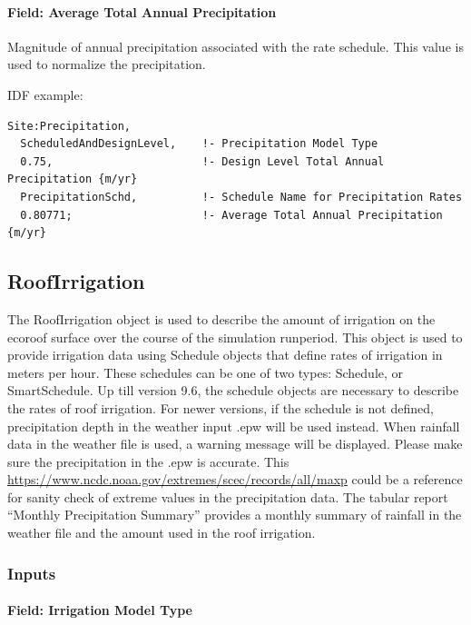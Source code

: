 \paragraph{Field: Average Total Annual Precipitation}\label{field-average-total-annual-precipitation}

Magnitude of annual precipitation associated with the rate schedule. This value is used to normalize the precipitation.

IDF example:

\begin{lstlisting}
Site:Precipitation,
  ScheduledAndDesignLevel,    !- Precipitation Model Type
  0.75,                       !- Design Level Total Annual Precipitation {m/yr}
  PrecipitationSchd,          !- Schedule Name for Precipitation Rates
  0.80771;                    !- Average Total Annual Precipitation {m/yr}
\end{lstlisting}

\subsection{RoofIrrigation}\label{roofirrigation}

The RoofIrrigation object is used to describe the amount of irrigation on the
ecoroof surface over the course of the simulation runperiod. This object is used
to provide irrigation data using Schedule objects that define rates of
irrigation in meters per hour. These schedules can be one of two types:
Schedule, or SmartSchedule. Up till version 9.6, the schedule objects are
necessary to describe the rates of roof irrigation. For newer versions, if the
schedule is not defined, precipitation depth in the weather input .epw will be
used instead. When rainfall data in the weather file is used, a
warning message will be displayed. Please make sure the precipitation in the
.epw is accurate. This \href{table by the State Climate Extreme
Committee}{https://www.ncdc.noaa.gov/extremes/scec/records/all/maxp} could be a
reference for sanity check of extreme values in the precipitation data. The
tabular report ``Monthly Precipitation Summary'' provides a monthly summary of
rainfall in the weather file and the amount used in the roof irrigation.

\subsubsection{Inputs}\label{inputs-23-002}

\paragraph{Field: Irrigation Model Type}\label{field-irrigation-model-type}

